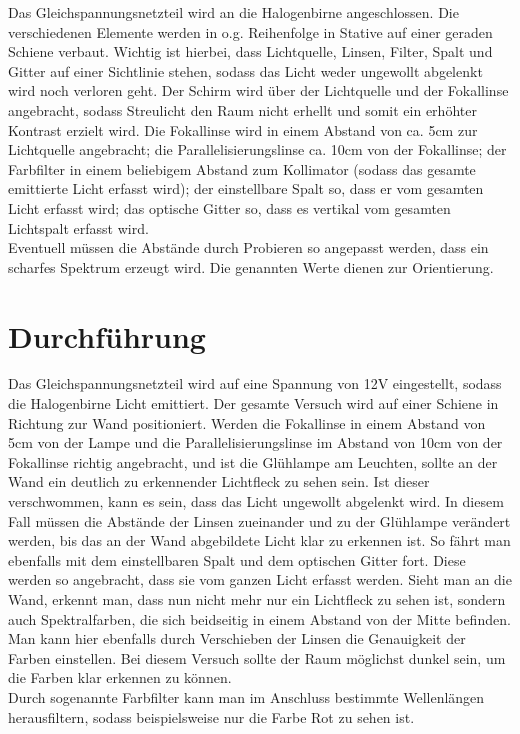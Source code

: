 \documentclass[12pt, a4paper]{article}
\begin{document}
Das Gleichspannungsnetzteil wird an die Halogenbirne angeschlossen.
Die verschiedenen Elemente werden in o.g. Reihenfolge in Stative auf einer geraden Schiene verbaut.
Wichtig ist hierbei, dass Lichtquelle, Linsen, Filter, Spalt und Gitter auf einer Sichtlinie stehen,
sodass das Licht weder ungewollt abgelenkt wird noch verloren geht. Der Schirm wird \"uber der Lichtquelle und der Fokallinse angebracht,
sodass Streulicht den Raum nicht erhellt und somit ein erh\"ohter Kontrast erzielt wird. Die Fokallinse wird in einem Abstand von ca.
5cm zur Lichtquelle angebracht; die Parallelisierungslinse ca. 10cm von der Fokallinse; der Farbfilter in einem beliebigem Abstand
zum Kollimator (sodass das gesamte emittierte Licht erfasst wird); der einstellbare Spalt so, dass er vom gesamten Licht erfasst wird;
das optische Gitter so, dass es vertikal vom gesamten Lichtspalt erfasst wird.\\Eventuell m\"ussen die Abst\"ande durch Probieren so angepasst werden, dass ein scharfes Spektrum erzeugt wird. Die genannten Werte dienen zur Orientierung.

\newpage
\section{Durchf\"uhrung}
Das Gleichspannungsnetzteil wird auf eine Spannung von 12V eingestellt, sodass die Halogenbirne Licht emittiert.
Der gesamte Versuch wird auf einer Schiene in Richtung zur Wand positioniert. Werden die Fokallinse in einem Abstand von 5cm von der
Lampe und die Parallelisierungslinse im Abstand von 10cm von der Fokallinse richtig angebracht, und ist die Gl\"uhlampe am Leuchten, sollte an der Wand ein deutlich zu erkennender Lichtfleck zu sehen sein.
Ist dieser verschwommen, kann es sein, dass das Licht ungewollt abgelenkt wird. In diesem Fall m\"ussen die Abst\"ande der Linsen zueinander und zu der Gl\"uhlampe ver\"andert werden,
bis das an der Wand abgebildete Licht klar zu erkennen ist. So f\"ahrt man ebenfalls mit dem einstellbaren Spalt und dem optischen Gitter fort.
Diese werden so angebracht, dass sie vom ganzen Licht erfasst werden. Sieht man an die Wand, erkennt man, dass nun nicht mehr nur ein Lichtfleck zu sehen ist,
sondern auch Spektralfarben, die sich beidseitig in einem Abstand von der Mitte befinden. Man kann hier ebenfalls durch Verschieben der Linsen die Genauigkeit der Farben einstellen.
Bei diesem Versuch sollte der Raum m\"oglichst dunkel sein, um die Farben klar erkennen zu k\"onnen.\\Durch sogenannte Farbfilter kann man im Anschluss bestimmte Wellenl\"angen herausfiltern, sodass beispielsweise nur die Farbe Rot zu sehen ist.
\end{document}
